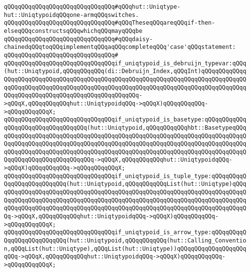 \newline
\verb|qQQqqQQqqQQqqQQqqQQqqQQqqQQqqQQq#qQQqhut::Uniqtype-hut::UniqtypoidqQQqone-armqQQqswitches.|\newline
\verb|qQQqqQQqqQQqqQQqqQQqqQQqqQQqqQQq#qQQqTheseqQQqareqQQqif-then-elseqQQqconstructsqQQqwhichqQQqmayqQQqbe|\newline
\verb|qQQqqQQqqQQqqQQqqQQqqQQqqQQqqQQq#qQQqdaisy-chainedqQQqtoqQQqimplementqQQqaqQQqcompleteqQQq'case'qQQqstatement:|\newline
\verb|qQQqqQQqqQQqqQQqqQQqqQQqqQQqqQQq#|\newline
\verb|qQQqqQQqqQQqqQQqqQQqqQQqqQQqqQQqif_uniqtypoid_is_debruijn_typevar:qQQq(hut::Uniqtypoid,qQQqqQQqqQQq(di::Debruijn_Index,qQQqInt)qQQqqQQqqQQqqQQqqQQqqQQqqQQqqQQqqQQqqQQqqQQqqQQqqQQqqQQqqQQqqQQqqQQqqQQqqQQqqQQqqQQqqQQqqQQqqQQqqQQqqQQqqQQqqQQqqQQqqQQqqQQqqQQqqQQqqQQqqQQqqQQqqQQqqQQqqQQqqQQqqQQqqQQqqQQqqQQqqQQqqQQqqQQqqQQq->qQQqX,qQQqqQQqqQQqhut::UniqtypoidqQQq->qQQqX)qQQqqQQqqQQq->qQQqqQQqqQQqX;|\newline
\verb|qQQqqQQqqQQqqQQqqQQqqQQqqQQqqQQqif_uniqtypoid_is_basetype:qQQqqQQqqQQqqQQqqQQqqQQqqQQqqQQqqQQq(hut::Uniqtypoid,qQQqqQQqqQQqhbt::BasetypeqQQqqQQqqQQqqQQqqQQqqQQqqQQqqQQqqQQqqQQqqQQqqQQqqQQqqQQqqQQqqQQqqQQqqQQqqQQqqQQqqQQqqQQqqQQqqQQqqQQqqQQqqQQqqQQqqQQqqQQqqQQqqQQqqQQqqQQqqQQqqQQqqQQqqQQqqQQqqQQqqQQqqQQqqQQqqQQqqQQqqQQqqQQqqQQqqQQqqQQqqQQqqQQqqQQqqQQqqQQqqQQqqQQqqQQqqQQqqQQq->qQQqX,qQQqqQQqqQQqhut::UniqtypoidqQQq->qQQqX)qQQqqQQqqQQq->qQQqqQQqqQQqX;|\newline
\verb|qQQqqQQqqQQqqQQqqQQqqQQqqQQqqQQqif_uniqtypoid_is_tuple_type:qQQqqQQqqQQqqQQqqQQqqQQqqQQq(hut::Uniqtypoid,qQQqqQQqqQQqList(hut::Uniqtype)qQQqqQQqqQQqqQQqqQQqqQQqqQQqqQQqqQQqqQQqqQQqqQQqqQQqqQQqqQQqqQQqqQQqqQQqqQQqqQQqqQQqqQQqqQQqqQQqqQQqqQQqqQQqqQQqqQQqqQQqqQQqqQQqqQQqqQQqqQQqqQQqqQQqqQQqqQQqqQQqqQQqqQQqqQQqqQQqqQQqqQQqqQQqqQQqqQQqqQQqqQQqqQQqqQQqqQQq->qQQqX,qQQqqQQqqQQqhut::UniqtypoidqQQq->qQQqX)qQQqqQQqqQQq->qQQqqQQqqQQqX;|\newline
\verb|qQQqqQQqqQQqqQQqqQQqqQQqqQQqqQQqif_uniqtypoid_is_arrow_type:qQQqqQQqqQQqqQQqqQQqqQQqqQQq(hut::Uniqtypoid,qQQqqQQqqQQq(hut::Calling_Convention,qQQqList(hut::Uniqtype),qQQqList(hut::Uniqtype))qQQqqQQqqQQqqQQqqQQqqQQq->qQQqX,qQQqqQQqqQQqhut::UniqtypoidqQQq->qQQqX)qQQqqQQqqQQq->qQQqqQQqqQQqX;|\newline
\newline
\newline
\newline
\newline
\newline
